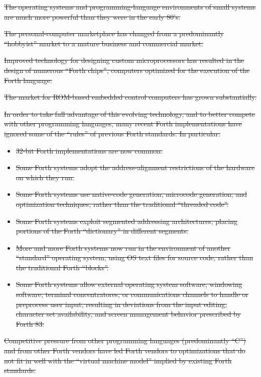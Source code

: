 \sout{%
The operating systems and programming-language environments of small
systems are much more powerful than they were in the early 80's.}

\sout{%
The personal-computer marketplace has changed from a predominantly
``hobbyist'' market to a mature business and commercial market.}

\sout{%
Improved technology for designing custom microprocessors has resulted
in the design of numerous ``Forth chips'', computers optimized for
the execution of the Forth language.}

\sout{%
The market for ROM-based embedded control computers has grown
substantially.}

\sout{%
In order to take full advantage of this evolving technology, and to
better compete with other programming languages, many recent Forth
implementations have ignored some of the ``rules'' of previous Forth
standards. In particular:}

\begin{itemize}
\item \sout{32-bit Forth implementations are now common.}
\item \sout{Some Forth systems adopt the address-alignment restrictions of
	the hardware on which they run.}
\item \sout{Some Forth systems use native-code generation, microcode
	generation, and optimization techniques, rather than the
	traditional ``threaded code''.}
\item \sout{Some Forth systems exploit segmented addressing architectures,
	placing portions of the Forth ``dictionary'' in different segments.}
\item \sout{More and more Forth systems now run in the environment of another
	``standard'' operating system, using OS text files for source code,
	rather than the traditional Forth ``blocks''.}
\item \sout{Some Forth systems allow external operating system software,
	windowing software, terminal con\-cen\-tratores, or communications
	channels to handle or preprocess user input, resulting in deviations
	from the input editing, character set availability, and screen
	management behavior prescribed by Forth 83.}
\end{itemize}

\sout{%
Competitive pressure from other programming languages (predominantly
``C'') and from other Forth ven\-dors have led Forth vendors to
optimizations that do not fit in well with the ``virtual machine
model'' implied by existing Forth standards.}


